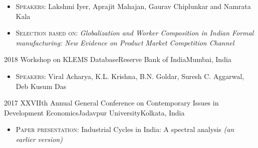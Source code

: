 \begin{conference}
{\begin{itemize}
                        \item \textsc{Speakers:} Lakshmi Iyer, Aprajit Mahajan, Gaurav Chiplunkar and Namrata Kala
                        \item \textsc{Selection based on:} \textit{Globalization and Worker Composition in Indian Formal manufacturing: New Evidence on Product Market Competition Channel}
                      \end{itemize}
                    }
\emptySeparator
  \experience
    {2018}   {Workshop on KLEMS Database}{Reserve Bank of India}{Mumbai, India}
    {} {
                      \begin{itemize}
                        \item \textsc{Speakers:} Viral Acharya, K.L. Krishna, B.N. Goldar, Suresh C. Aggarwal, Deb Kusum Das            
                      \end{itemize}
                    }
\emptySeparator
  \experience
    {2017}   {XXVIIth Annual General Conference on Contemporary Issues in Development Economics}{Jadavpur University}{Kolkata, India}
    {} {
                      \begin{itemize}
                        \item \textsc{Paper presentation:} Industrial Cycles in India: A spectral analysis \textit{(an earlier version)}
                      \end{itemize}
                    }

\end{conference}